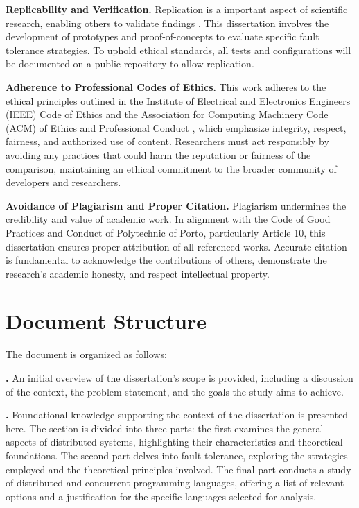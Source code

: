 \textbf{Replicability and Verification.} Replication is a important aspect of scientific research, enabling others to validate findings \cite{nspe-ethics}. This dissertation involves the development of prototypes and proof-of-concepts to evaluate specific fault tolerance strategies. To uphold ethical standards, all tests and configurations will be documented on a public repository to allow replication.

\textbf{Adherence to Professional Codes of Ethics.} This work adheres to the ethical principles outlined in the Institute of Electrical and Electronics Engineers (IEEE) Code of Ethics \cite{ieee-ethics} and the Association for Computing Machinery Code (ACM) of Ethics and Professional Conduct \cite{acm-ethics}, which emphasize integrity, respect, fairness, and authorized use of content. Researchers must act responsibly by avoiding any practices that could harm the reputation or fairness of the comparison, maintaining an ethical commitment to the broader community of developers and researchers.

\textbf{Avoidance of Plagiarism and Proper Citation.} Plagiarism undermines the credibility and value of academic work. In alignment with the Code of Good Practices and Conduct of Polytechnic of Porto, particularly Article 10, this dissertation ensures proper attribution of all referenced works. Accurate citation is fundamental to acknowledge the contributions of others, demonstrate the research’s academic honesty, and respect intellectual property.

\section{Document Structure}

The document is organized as follows:

\textbf{.} An initial overview of the dissertation's scope is provided, including a discussion of the context, the problem statement, and the goals the study aims to achieve.

\textbf{.} Foundational knowledge supporting the context of the dissertation is presented here. The section is divided into three parts: the first examines the general aspects of distributed systems, highlighting their characteristics and theoretical foundations. The second part delves into fault tolerance, exploring the strategies employed and the theoretical principles involved. The final part conducts a study of distributed and concurrent programming languages, offering a list of relevant options and a justification for the specific languages selected for analysis.

